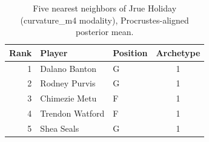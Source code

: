 \begin{table}[htbp]
  \centering\small
  \begin{tabular}{rllc}
    \toprule
    Rank & Player & Position & Archetype \\
    \midrule
    1 & Dalano Banton & G & 1 \\
    2 & Rodney Purvis & G & 1 \\
    3 & Chimezie Metu & F & 1 \\
    4 & Trendon Watford & F & 1 \\
    5 & Shea Seals & G & 1 \\
    \bottomrule
  \end{tabular}
  \caption{Five nearest neighbors of Jrue Holiday (curvature_m4 modality), Procrustes-aligned posterior mean.}
  \label{tab:Jrue_Holiday_neighbors_curvature_m4}
\end{table}

